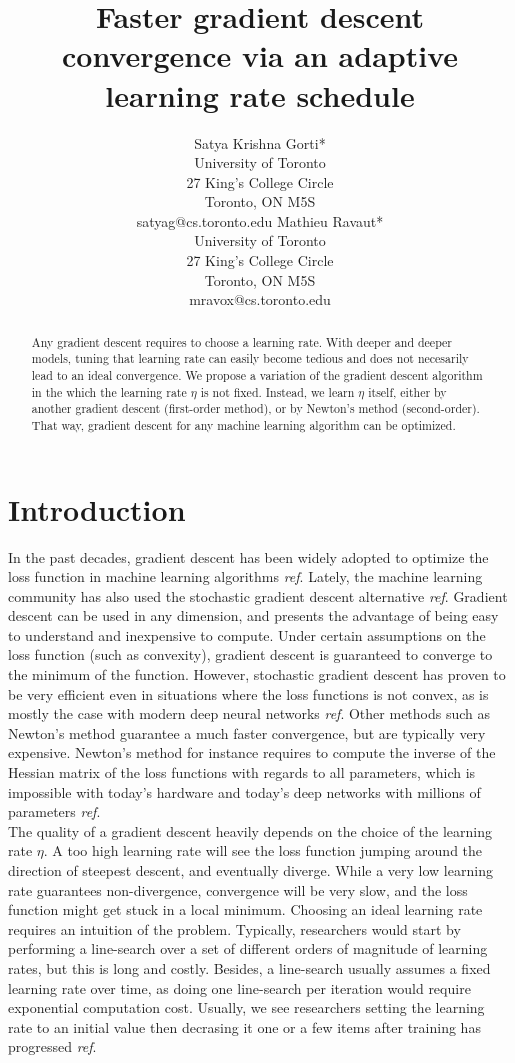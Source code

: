\documentclass{article}
\title{Faster gradient descent convergence via an adaptive learning rate schedule}
\author{
  	Satya Krishna Gorti*\\
  	University of Toronto\\
  	27 King's College Circle\\
  	Toronto, ON M5S\\
  	satyag@cs.toronto.edu
  	\And
	Mathieu Ravaut* \\ 
	University of Toronto \\
	27 King's College Circle\\
	Toronto, ON M5S\\
	mravox@cs.toronto.edu \\
}
\begin{document}
  
  \maketitle
  
  \begin{abstract}
    Any gradient descent requires to choose a learning rate. With deeper and deeper models, tuning that learning rate can easily become tedious and does not necesarily lead to an ideal convergence. We propose a variation of the gradient descent algorithm in the which the learning rate $\eta$ is not fixed. Instead, we learn $\eta$ itself, either by another gradient descent (first-order method), or by Newton's method (second-order). That way, gradient descent for any machine learning algorithm can be optimized. 
  \end{abstract}
  
  \thispagestyle{equalc}
  \section{Introduction}
  
  In the past decades, gradient descent has been widely adopted to optimize the loss function in machine learning algorithms \emph{ref}. Lately, the machine learning community has also used the stochastic gradient descent alternative \emph{ref}. Gradient descent can be used in any dimension, and presents the advantage of being easy to understand and inexpensive to compute. Under certain assumptions on the loss function (such as convexity), gradient descent is guaranteed to converge to the minimum of the function. However, stochastic gradient descent has proven to be very efficient even in situations where the loss functions is not convex, as is mostly the case with modern deep neural networks \emph{ref}. Other methods such as Newton's method guarantee a much faster convergence, but are typically very expensive. Newton's method for instance requires to compute the inverse of the Hessian matrix of the loss functions with regards to all parameters, which is impossible with today's hardware and today's deep networks with millions of parameters \emph{ref}. \\
  
  The quality of a gradient descent heavily depends on the choice of the learning rate $\eta$. A too high learning rate will see the loss function jumping around the direction of steepest descent, and eventually diverge. While a very low learning rate guarantees non-divergence, convergence will be very slow, and the loss function might get stuck in a local minimum. Choosing an ideal learning rate requires an intuition of the problem. Typically, researchers would start by performing a line-search over a set of different orders of magnitude of learning rates, but this is long and costly. Besides, a line-search usually assumes a fixed learning rate over time, as doing one line-search per iteration would require exponential computation cost. Usually, we see researchers setting the learning rate to an initial value then decrasing it one or a few items after training has progressed \emph{ref}.\\
  
\end{document}
